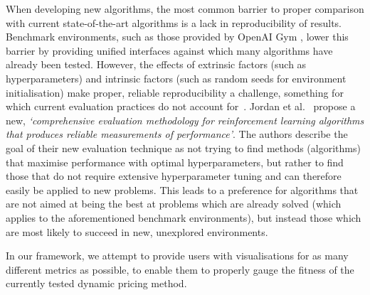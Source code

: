 When developing new algorithms, the most common barrier to proper comparison with current state-of-the-art algorithms is a lack in reproducibility of results. Benchmark environments, such as those provided by OpenAI Gym \cite{OpenAIGym}, lower this barrier by providing unified interfaces against which many algorithms have already been tested. However, the effects of extrinsic factors (such as hyperparameters) and intrinsic factors (such as random seeds for environment initialisation) make proper, reliable reproducibility a challenge, something for which current evaluation practices do not account for~\cite{DRLThatMatters}. Jordan et al.~\cite{EvaluatingPerformance} propose a new, \emph{`comprehensive evaluation methodology for reinforcement learning algorithms that produces reliable measurements of performance'}. The authors describe the goal of their new evaluation technique as not trying to find methods (algorithms) that maximise performance with optimal hyperparameters, but rather to find those that do not require extensive hyperparameter tuning and can therefore easily be applied to new problems. This leads to a preference for algorithms that are not aimed at being the best at problems which are already solved (which applies to the aforementioned benchmark environments), but instead those which are most likely to succeed in new, unexplored environments.

In our framework, we attempt to provide users with visualisations for as many different metrics as possible, to enable them to properly gauge the fitness of the currently tested dynamic pricing method.